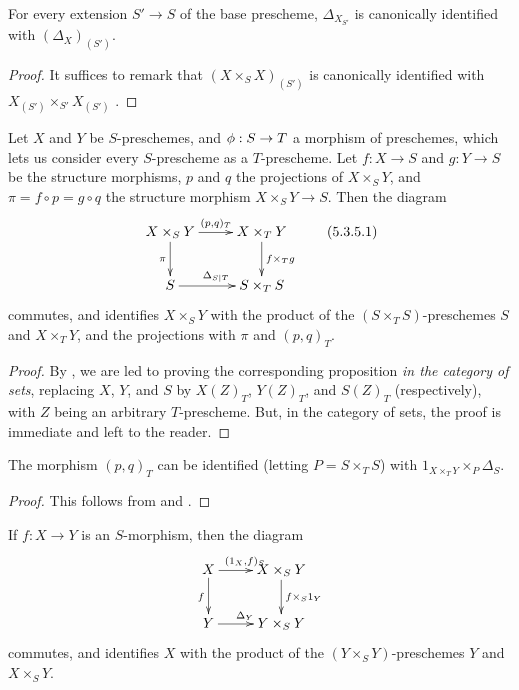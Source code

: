 \begin{env}
\label{I.5.3.3}
\end{env}

\begin{corollary}[5.3.4]
\label{I.5.3.4}
For every extension $S'\to S$ of the base prescheme, $\Delta_{X_{S'}}$ is canonically identified with $(\Delta_X)_{(S')}$.
\end{corollary}

\begin{proof}
It suffices to remark that $(X\times_S X)_{(S')}$ is canonically identified with $X_{(S')}\times_{S'}X_{(S')}$ .
\end{proof}

\begin{proposition}[5.3.5]
\label{I.5.3.5}
Let $X$ and $Y$ be $S$-preschemes, and $\vphi:S\to T$ a morphism of preschemes, which lets us consider every $S$-prescheme as a $T$-prescheme.
Let $f:X\to S$ and $g:Y\to S$ be the structure morphisms, $p$ and $q$ the projections of $X\times_S Y$, and $\pi=f\circ p=g\circ q$ the structure morphism $X\times_S Y\to S$.
Then the diagram
\[
\label{I.5.3.5.1}
  \xymatrix{
    X\times_S Y\ar[r]^{(p,q)_T}\ar[d]_\pi &
    X\times_T Y\ar[d]^{f\times_T g}\\
    S\ar[r]^{\Delta_{S|T}} &
    S\times_T S
  }
  \tag{5.3.5.1}
\]
commutes, and identifies $X\times_S Y$ with the product of the $(S\times_T S)$-preschemes $S$ and $X\times_T Y$, and the projections with $\pi$ and $(p,q)_T$.
\end{proposition}

\begin{proof}
By , we are led to proving the corresponding proposition \emph{in the category of sets}, replacing $X$, $Y$, and $S$ by $X(Z)_T$, $Y(Z)_T$, and $S(Z)_T$ (respectively), with $Z$ being an arbitrary $T$-prescheme.
But, in the category of sets, the proof is immediate and left to the reader.
\end{proof}

\begin{corollary}[5.3.6]
\label{I.5.3.6}
The morphism $(p,q)_T$ can be identified (letting $P=S\times_T S$) with $1_{X\times_T Y}\times_P\Delta_S$.
\end{corollary}

\begin{proof}
This follows from  and .
\end{proof}

\begin{corollary}[5.3.7]
\label{I.5.3.7}
If $f:X\to Y$ is an $S$-morphism, then the diagram
\[
  \xymatrix{
    X\ar[r]^{(1_X,f)_S}\ar[d]_f &
    X\times_S Y\ar[d]^{f\times_S 1_Y}\\
    Y\ar[r]^{\Delta_Y} &
    Y\times_S Y
  }
\]
commutes, and identifies $X$ with the product of the $(Y\times_S Y)$-preschemes $Y$ and $X\times_S Y$.
\end{corollary}

